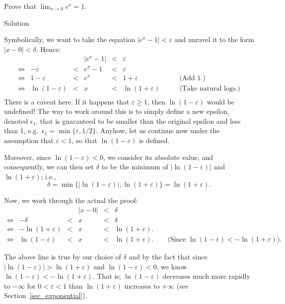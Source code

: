 \begin{example}
Prove that $\displaystyle \lim_{x\rightarrow 0} e^x = 1 $.

Solution 


Symbolically, we want to take the equation $|e^x - 1| < \varepsilon$ and unravel it to the form $|x-0| < \delta$.  Hence:
$$
\begin{array}{rrcccll}
&&&|e^x - 1| &<& \varepsilon&\\
\Leftrightarrow&-\varepsilon &<& e^x - 1 &<& \varepsilon&\\
\Leftrightarrow&1-\varepsilon &<& e^x &<& 1+\varepsilon & \qquad \textrm{(Add 1.)}\\
\Leftrightarrow&\ln(1-\varepsilon) &<& x &<& \ln(1+\varepsilon) & \qquad \textrm{(Take natural logs.)}\\
\end{array}
$$
There is a caveat here.  If it happens that $\varepsilon \ge 1$, then $\ln(1-\varepsilon)$ would be undefined!  The way to work around this is to simply define a new epsilon, denoted $\epsilon_1$, that is guaranteed to be smaller than the original epsilon and less than 1, e.g.\ $\epsilon_1 = \min\{\varepsilon, 1/2\}$. Anyhow, let us continue now under the assumption that $\varepsilon<1$, so that $\ln (1-\varepsilon)$ is defined. 

Moreover, since $\ln (1-\varepsilon) <0$, we consider its absolute value, and consequently, we can then set $\delta$ to be the minimum of $|\ln(1-\varepsilon)|$ and $\ln(1+\varepsilon)$; i.e.,  
$$\delta = \min\{|\ln(1-\varepsilon)|, \ln(1+\varepsilon)\} = \ln(1+\varepsilon).$$  


Now, we work through the actual the proof:
$$
\begin{array}{rrcccl}
&&&|x - 0|&<&\delta\\
\Leftrightarrow&-\delta &<& x &<& \delta   \\
\Leftrightarrow&-\ln(1+\varepsilon) &<& x &<& \ln(1+\varepsilon). \\  
\Leftrightarrow&\ln(1-\varepsilon) &<& x &<& \ln(1+\varepsilon).  \qquad\text{(Since $\ln(1-\varepsilon) < -\ln(1+\varepsilon)$).}
\end{array}
$$

The above line is true by our choice of $\delta$ and by the fact that since $|\ln(1-\varepsilon)|>\ln(1+\varepsilon)$ and $\ln(1-\varepsilon)<0$, we know $\ln(1-\varepsilon) < -\ln(1+\varepsilon )$. That is; $\ln(1-\varepsilon)$ decreases much more rapidly to $-\infty$ for $0<\varepsilon<1$ than $\ln(1+\varepsilon)$ increases to $+\infty$ (see Section~\ref{sec_exponential}).


\end{example}
